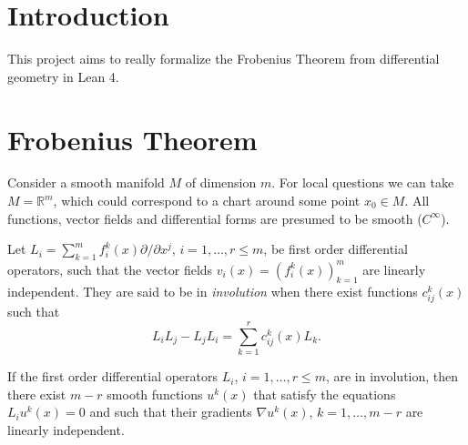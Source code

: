 %

\chapter{Introduction}

This project aims to really formalize the Frobenius Theorem from differential geometry in Lean 4.

\chapter{Frobenius Theorem}

Consider a smooth manifold $M$ of dimension $m$. For local questions we can take
$M=\mathbb{R}^m$, which could correspond to a chart around some point $x_0\in M$.
All functions, vector fields and differential forms are presumed to be smooth ($C^\infty$).

\begin{definition}[involutivity] \label{def:invol}
Let $L_i = \sum_{k=1}^m f_i^k(x) \partial/\partial x^j$, $i=1,\ldots,r\le m$, be
first order differential operators, such that the vector fields $v_i(x) =
(f_i^k(x))_{k=1}^m$ are linearly independent. They are said to be in
\emph{involution} when there exist functions $c^k_{ij}(x)$ such that
\[
  L_i L_j - L_j L_i = \sum_{k=1}^r c^k_{ij}(x) L_k .
\]
\end{definition}

\begin{theorem} \label{thm:frob-loc}
If the first order differential operators $L_i$, $i=1,\ldots,r \le m$, are in
involution, then there exist $m-r$ smooth functions $u^k(x)$ that satisfy the
equations $L_i u^k(x) = 0$ and such that their gradients $\nabla u^k(x)$,
$k=1,\ldots,m-r$ are linearly independent.
\end{theorem}

